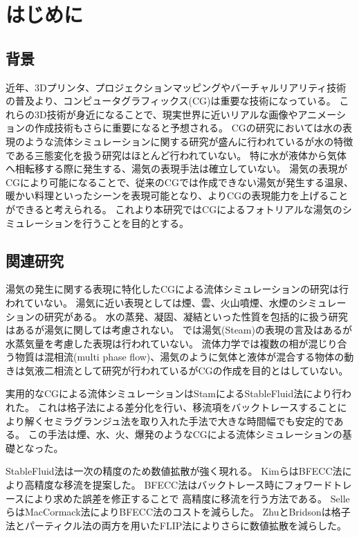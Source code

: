 \section{はじめに}
\subsection{背景}
近年、3Dプリンタ、プロジェクションマッピングやバーチャルリアリティ技術の普及より、コンピュータグラフィックス(CG)は重要な技術になっている。
これらの3D技術が身近になることで、現実世界に近いリアルな画像やアニメーションの作成技術もさらに重要になると予想される。 CGの研究においては水の表現のような流体シミュレーションに関する研究が盛んに行われているが水の特徴である三態変化を扱う研究はほとんど行われていない。
特に水が液体から気体へ相転移する際に発生する、湯気の表現手法は確立していない。
湯気の表現がCGにより可能になることで、従来のCGでは作成できない湯気が発生する温泉、暖かい料理といったシーンを表現可能となり、よりCGの表現能力を上げることができると考えられる。
これより本研究ではCGによるフォトリアルな湯気のシミュレーションを行うことを目的とする。
\subsection{関連研究}
湯気の発生に関する表現に特化したCGによる流体シミュレーションの研究は行われていない。
湯気に近い表現としては煙\cite{Fedkiw2001}、雲\cite{Dobashi2000}\cite{Miyazaki2001}\cite{Miyazaki2002}、火山噴煙\cite{Mizuno2003}\cite{Mizuno2004}、水煙\cite{Nielsen2013}のシミュレーションの研究がある。
水の蒸発、凝固、凝結といった性質を包括的に扱う研究\cite{Fujisawa2008}はあるが湯気に関しては考慮されない。
\cite{Foster1997}では湯気(Steam)の表現の言及はあるが水蒸気量を考慮した表現は行われていない。
流体力学では複数の相が混じり合う物質は混相流(multi phase flow)、湯気のように気体と液体が混合する物体の動きは気液二相流として研究が行われているがCGの作成を目的とはしていない。

実用的なCGによる流体シミュレーションはStamによるStableFluid法\cite{Stam1999}により行われた。
これは格子法による差分化を行い、移流項をバックトレースすることにより解くセミラグランジュ法を取り入れた手法で大きな時間幅でも安定的である。
この手法は煙\cite{Fedkiw2001}、水\cite{Foster2001}、火\cite{Nguyen2002}、爆発\cite{Feldman2003}のようなCGによる流体シミュレーションの基礎となった。

StableFluid法は一次の精度のため数値拡散が強く現れる。
Kimら\cite{Kim2005}はBFECC法により高精度な移流を提案した。
BFECC法はバックトレース時にフォワードトレースにより求めた誤差を修正することで	高精度に移流を行う方法である。
Selleら\cite{Selle2008}はMacCormack法によりBFECC法のコストを減らした。
ZhuとBridson\cite{Zhu2005}は格子法とパーティクル法の両方を用いたFLIP法によりさらに数値拡散を減らした。



